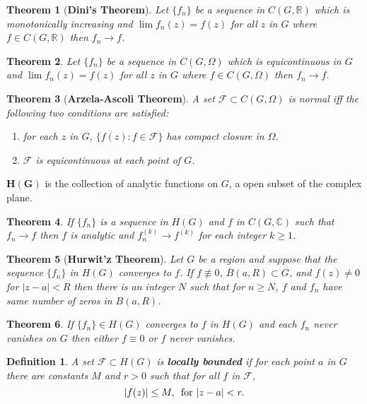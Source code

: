 \documentclass[answers, a4paper, 12pt]{exam}
\newtheorem{theorem}{Theorem}[section]
\newtheorem{definition}{Definition}
\newcommand{\C}{\mathbb{C}}
\newcommand{\R}{\mathbb{R}}
\begin{document}
\begin{theorem}[\textbf{Dini's Theorem}]
    Let $\{f_n\}$ be a sequence in $C(G,\R)$ which is monotonically increasing and $\lim{f_n(z)}=f(z)$ for all $z$ in $G$ where $f\in C(G,\R)$ then $f_n\to f$.
\end{theorem}

\begin{theorem}
    Let $\{f_n\}$ be a sequence in $C(G,\Omega)$ which is equicontinuous in $G$ and $\lim{f_n(z)}=f(z)$ for all $z$ in $G$ where $f\in C(G,\Omega)$ then $f_n\to f$.
\end{theorem}

\begin{theorem}[\textbf{Arzela-Ascoli Theorem}]
    A set $\mathcal{F}\subset C(G,\Omega)$ is normal iff the following two conditions are satisfied:
    \begin{enumerate}
        \item for each $z$ in $G$, $\{f(z): f\in\mathcal{F}\}$ has compact closure in $\Omega$.
        \item $\mathcal{F}$ is equicontinuous at each point of $G$.
    \end{enumerate}
\end{theorem}

\justifying $\bm{H(G)}$ is the collection of analytic functions on $G$, a open subset of the complex plane.

\begin{theorem}
    If $\{f_n\}$ is a sequence in $H(G)$ and $f$ in $C(G,\C)$ such that $f_n\to f$ then $f$ is analytic and $f_n^{(k)}\to f^{(k)}$ for each integer $k\geq 1$.
\end{theorem}

\begin{theorem}[\textbf{Hurwit'z Theorem}]
    Let $G$ be a region and suppose that the sequence $\{f_n\}$ in $H(G)$ converges to $f$. If $f\not\equiv 0$, $\overline{B}(a,R)\subset G$, and $f(z)\neq 0$ for $|z-a|<R$ then there is an integer $N$ such that for $n\geq N$, $f$ and $f_n$ have same number of zeros in $B(a,R)$.
\end{theorem}

\begin{theorem}
    If $\{f_n\}\in H(G)$ converges to $f$ in $H(G)$ and each $f_n$ never vanishes on $G$ then either $f\equiv 0$ or $f$ never vanishes.
\end{theorem}

\begin{definition}
    A set $\mathcal{F}\subset H(G)$ is \textbf{locally bounded} if for each point $a$ in $G$ there are constants $M$ and $r>0$ such that for all $f$ in $\mathcal{F}$,
    $$|f(z)|\leq M,\,\,\,\text{for\,\,}|z-a|<r.$$
\end{definition}
\end{document}
